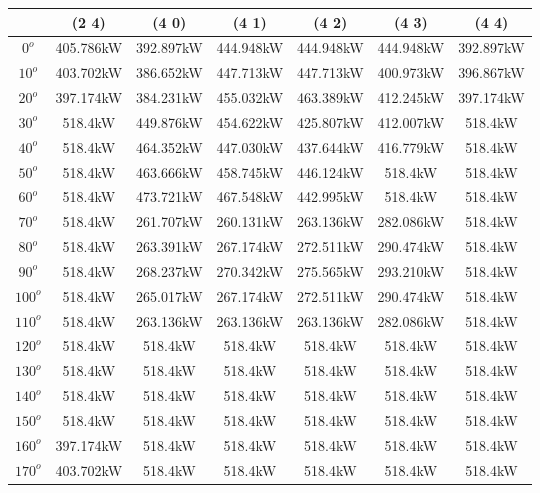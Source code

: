         \begin{table}[H]
        	\centering
        	\begin{tabular}{|c|c|c|c|c|c|c|} \hline
        			& (2 4)		& (4 0)		& (4 1)		& (4 2)		& (4 3)		& (4 4)		\\ \hline
        		$0^o$	& 405.786kW	& 392.897kW	& 444.948kW	& 444.948kW	& 444.948kW	& 392.897kW	\\ \hline
        		$10^o$	& 403.702kW	& 386.652kW	& 447.713kW	& 447.713kW	& 400.973kW	& 396.867kW	\\ \hline
        		$20^o$	& 397.174kW	& 384.231kW	& 455.032kW	& 463.389kW	& 412.245kW	& 397.174kW	\\ \hline
        		$30^o$	& 518.4kW	& 449.876kW	& 454.622kW	& 425.807kW	& 412.007kW	& 518.4kW	\\ \hline
        		$40^o$	& 518.4kW	& 464.352kW	& 447.030kW	& 437.644kW	& 416.779kW	& 518.4kW	\\ \hline
        		$50^o$	& 518.4kW	& 463.666kW	& 458.745kW	& 446.124kW	& 518.4kW	& 518.4kW	\\ \hline
        		$60^o$	& 518.4kW	& 473.721kW	& 467.548kW	& 442.995kW	& 518.4kW	& 518.4kW	\\ \hline
        		$70^o$	& 518.4kW	& 261.707kW	& 260.131kW	& 263.136kW	& 282.086kW	& 518.4kW	\\ \hline
        		$80^o$	& 518.4kW	& 263.391kW	& 267.174kW	& 272.511kW	& 290.474kW	& 518.4kW	\\ \hline
        		$90^o$	& 518.4kW	& 268.237kW	& 270.342kW	& 275.565kW	& 293.210kW	& 518.4kW	\\ \hline
        		$100^o$	& 518.4kW	& 265.017kW	& 267.174kW	& 272.511kW	& 290.474kW	& 518.4kW	\\ \hline
        		$110^o$	& 518.4kW	& 263.136kW	& 263.136kW	& 263.136kW	& 282.086kW	& 518.4kW	\\ \hline
        		$120^o$	& 518.4kW	& 518.4kW	& 518.4kW	& 518.4kW	& 518.4kW	& 518.4kW	\\ \hline
        		$130^o$	& 518.4kW	& 518.4kW	& 518.4kW	& 518.4kW	& 518.4kW	& 518.4kW	\\ \hline
        		$140^o$	& 518.4kW	& 518.4kW	& 518.4kW	& 518.4kW	& 518.4kW	& 518.4kW	\\ \hline
        		$150^o$	& 518.4kW	& 518.4kW	& 518.4kW	& 518.4kW	& 518.4kW	& 518.4kW	\\ \hline
        		$160^o$	& 397.174kW	& 518.4kW	& 518.4kW	& 518.4kW	& 518.4kW	& 518.4kW	\\ \hline
        		$170^o$	& 403.702kW	& 518.4kW	& 518.4kW	& 518.4kW	& 518.4kW	& 518.4kW	\\ \hline

\end{tabular}
\end{table}
